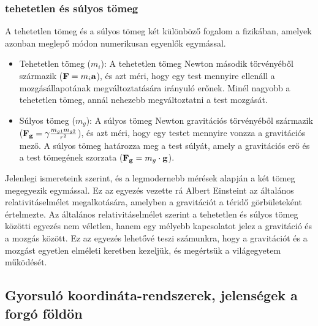 \documentclass[../main.tex]{subfiles}
\begin{document}
\subsubsection{tehetetlen és súlyos tömeg}
A tehetetlen tömeg és a súlyos tömeg két különböző fogalom a fizikában, amelyek azonban meglepő módon numerikusan egyenlők egymással.
\begin{itemize}
    \item Tehetetlen tömeg ($m_i$): A tehetetlen tömeg Newton második törvényéből származik ($\bold{F} = m_i\bold{a}$), és azt méri, hogy egy test mennyire ellenáll a mozgásállapotának megváltoztatására irányuló erőnek. Minél nagyobb a tehetetlen tömeg, annál nehezebb megváltoztatni a test mozgását.
    \item Súlyos tömeg ($m_g$): A súlyos tömeg Newton gravitációs törvényéből származik ($\bold{F_g} = \gamma \frac{m_{g1}m_{g2}}{r^2}$), és azt méri, hogy egy testet mennyire vonzza a gravitációs mező. A súlyos tömeg határozza meg a test súlyát, amely a gravitációs erő és a test tömegének szorzata ($\bold{F_g} = m_g\cdot \bold{g}$).
\end{itemize}
Jelenlegi ismereteink szerint, és a legmodernebb mérések alapján a két tömeg megegyezik egymással. Ez az egyezés vezette rá Albert Einsteint az általános relativitáselmélet megalkotására,
amelyben a gravitációt a téridő görbületeként értelmezte. Az általános relativitáselmélet szerint a tehetetlen és súlyos tömeg közötti egyezés nem véletlen, hanem egy mélyebb kapcsolatot jelez a gravitáció és a mozgás között.
Ez az egyezés lehetővé teszi számunkra, hogy a gravitációt és a mozgást egyetlen elméleti keretben kezeljük, és megértsük a világegyetem működését.

\subsection{Gyorsuló koordináta-rendszerek, jelenségek a forgó földön}
\end{document}
